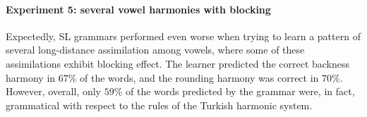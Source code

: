 \begin{table}[h!]
\centering
{}
\caption{SL learning of several vowel harmonies without blockers; abstract representation.}
\end{table}


\paragraph{Experiment 5: several vowel harmonies with blocking}

Expectedly, SL grammars performed even worse when trying to learn a pattern of several long-distance assimilation among vowels, where some of these assimilations exhibit blocking effect.
The learner predicted the correct backness harmony in $67$\% of the words, and the rounding harmony was correct in $70$\%.
However, overall, only $59$\% of the words predicted by the grammar were, in fact, grammatical with respect to the rules of the Turkish harmonic system.

